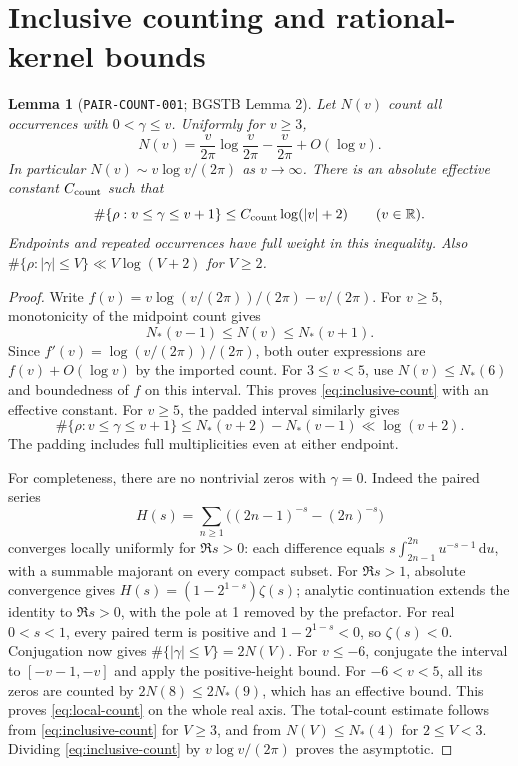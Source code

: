 \documentclass[11pt]{article}
\newtheorem{lemma}{Lemma}
\newcommand{\dd}{\,\mathrm d}
\begin{document}
\section{Inclusive counting and rational-kernel bounds}

\begin{lemma}[\texttt{PAIR-COUNT-001}; BGSTB Lemma 2]\label{lem:pair-count}
Let \(N(v)\) count all occurrences with \(0<\gamma\leq v\).
Uniformly for \(v\geq3\),
\begin{equation}\label{eq:inclusive-count}
 N(v)=\frac{v}{2\pi}\log\frac{v}{2\pi}-\frac{v}{2\pi}+O(\log v).
\end{equation}
In particular \(N(v)\sim v\log v/(2\pi)\) as \(v\to\infty\).
There is an absolute effective constant \(C_{\rm count}\) such that
\begin{equation}\label{eq:local-count}
 \#\{\rho:v\leq\gamma\leq v+1\}
 \leq C_{\rm count}\log(|v|+2)\qquad(v\in\mathbb R).
\end{equation}
Endpoints and repeated occurrences have full weight in this inequality.
Also \(\#\{\rho:|\gamma|\leq V\}\ll V\log(V+2)\) for \(V\geq2\).
\end{lemma}
\begin{proof}
Write \(f(v)=v\log(v/(2\pi))/(2\pi)-v/(2\pi)\).
For \(v\geq5\), monotonicity of the midpoint count gives
\[
 N_*(v-1)\leq N(v)\leq N_*(v+1).
\]
Since \(f'(v)=\log(v/(2\pi))/(2\pi)\), both outer expressions
are \(f(v)+O(\log v)\) by the imported count. For \(3\leq v<5\),
use \(N(v)\leq N_*(6)\) and boundedness of \(f\) on this interval.
This proves \eqref{eq:inclusive-count} with an effective constant.
For \(v\geq5\), the padded interval similarly gives
\[
 \#\{\rho:v\leq\gamma\leq v+1\}
 \leq N_*(v+2)-N_*(v-1)\ll\log(v+2).
\]
The padding includes full multiplicities even at either endpoint.

For completeness, there are no nontrivial zeros with \(\gamma=0\).
Indeed the paired series
\[
 H(s)=\sum_{n\geq1}\big((2n-1)^{-s}-(2n)^{-s}\big)
\]
converges locally uniformly for \(\Re s>0\): each difference equals
\(s\int_{2n-1}^{2n}u^{-s-1}\dd u\), with a summable majorant on
every compact subset. For \(\Re s>1\), absolute convergence gives
\(H(s)=(1-2^{1-s})\zeta(s)\); analytic continuation extends the identity
to \(\Re s>0\), with the pole at 1 removed by the prefactor.
For real \(0<s<1\), every paired term is positive and
\(1-2^{1-s}<0\), so \(\zeta(s)<0\).
Conjugation now gives \(\#\{|\gamma|\leq V\}=2N(V)\).
For \(v\leq-6\), conjugate the interval to \([-v-1,-v]\) and apply
the positive-height bound. For \(-6<v<5\), all its zeros are counted
by \(2N(8)\leq2N_*(9)\), which has an effective bound.
This proves \eqref{eq:local-count} on the whole real axis.
The total-count estimate follows from \eqref{eq:inclusive-count}
for \(V\geq3\), and from \(N(V)\leq N_*(4)\) for \(2\leq V<3\).
Dividing \eqref{eq:inclusive-count} by \(v\log v/(2\pi)\)
proves the asymptotic.
\end{proof}
\end{document}
